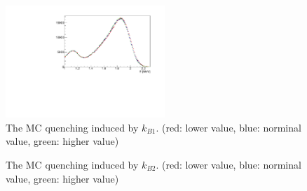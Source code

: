 \begin{figure}[h!]
\centering
\includegraphics[width=60mm]{Figures/kb1.pdf}
\caption{The MC quenching induced by $k_{B1}$. (red: lower value, blue: norminal value, green: higher value)}
\label{fig:kb1plot}
\end{figure}
 
\begin{figure}[h!]
\centering
{}\quad
{}
\caption{The MC quenching induced by $k_{B2}$. (red: lower value, blue: norminal value, green: higher value)}
\label{fig:kb2plot}
\end{figure}

